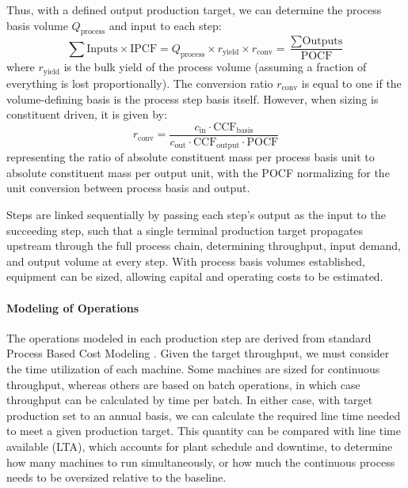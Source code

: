 Thus, with a defined output production target, we can determine the process basis volume $Q_{\text{process}}$ and input to each step:
\begin{equation}
    \sum \text{Inputs} \times \text{IPCF} = Q_{\text{process}} \times r_{\text{yield}} 
    \times r_{\text{conv}} = \frac{\sum \text{Outputs}}{\text{POCF}}
\end{equation}
where $r_{\text{yield}}$ is the bulk yield of the process volume (assuming a fraction of everything is lost proportionally). The conversion ratio $r_{\text{conv}}$ is equal to one if the volume-defining basis is the process step basis itself. However, when sizing is constituent driven, it is given by:
\begin{equation}
    r_{\text{conv}} = \frac{c_{\text{in}} \cdot \text{CCF}_{\text{basis}}}{c_{\text{out}} \cdot \text{CCF}_{\text{output}} \cdot \text{POCF}}
\end{equation}
\alteqend
representing the ratio of absolute constituent mass per process basis unit to absolute constituent mass per output unit, with the POCF normalizing for the unit conversion between process basis and output. 

Steps are linked sequentially by passing each step's output as the input to the succeeding step, such that a single terminal production target propagates upstream through the full process chain, determining throughput, input demand, and output volume at every step. With process basis volumes established, equipment can be sized, allowing capital and operating costs to be estimated.

\paragraph{Modeling of Operations}

The operations modeled in each production step are derived from standard Process Based Cost Modeling \citep{kirchainCostModelingMaterials2001, fuchsStrategicMaterialsSelection2008}. Given the target throughput, we must consider the time utilization of each machine. Some machines are sized for continuous throughput, whereas others are based on batch operations, in which case throughput can be calculated by time per batch. In either case, with target production set to an annual basis, we can calculate the required line time needed to meet a given production target. This quantity can be compared with line time available (LTA), which accounts for plant schedule and downtime, to determine how many machines to run simultaneously, or how much the continuous process needs to be oversized relative to the baseline.

